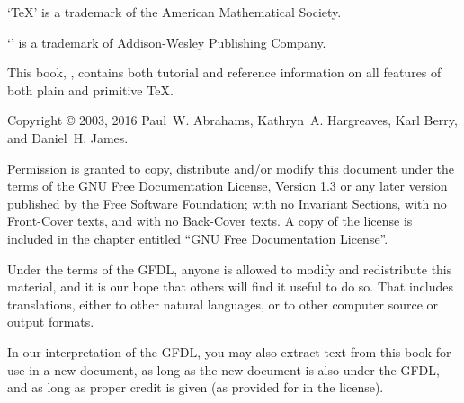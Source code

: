 



% 
\noheadlinetrue
\sinkage

\noindent `\TeX' is a trademark of the American Mathematical Society.

\noindent `\Metafont' is a trademark of Addison-Wesley Publishing Company.

\bigskip
\noindent This book, \thisbook, contains both tutorial and reference
information on all features of both plain and primitive \TeX.

\bigskip

\noindent Copyright \copyright{} 2003, 2016 Paul~W. Abrahams,
Kathryn~A. Hargreaves, Karl Berry, and Daniel~H. James.

\bigskip
\noindent Permission is granted to copy, distribute and/or modify this
document under the terms of the GNU Free Documentation License, Version
1.3 or any later version published by the Free Software Foundation; with
no Invariant Sections, with no Front-Cover texts, and with no Back-Cover
texts.  A copy of the license is included in the chapter entitled ``GNU
Free Documentation License''.

\medskip\noindent
Under the terms of the GFDL, anyone is allowed to modify and
redistribute this material, and it is our hope that others will find it
useful to do so.  That includes translations, either to other natural
languages, or to other computer source or output formats.

\medskip\noindent
In our interpretation of the GFDL, you may also extract text from this
book for use in a new document, as long as the new document is also
under the GFDL, and as long as proper credit is given (as provided for
in the license).


\pagebreak
\byebye
